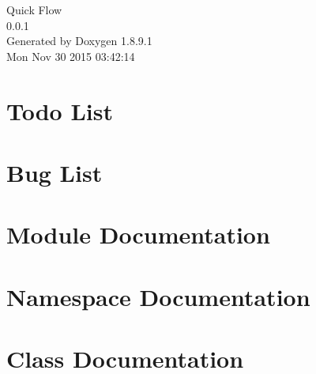 \documentclass[twoside]{article}
\newcommand{\+}{\discretionary{\mbox{\scriptsize$\hookleftarrow$}}{}{}}
\begin{document}
\hypersetup{pageanchor=false,
             bookmarks=true,
             bookmarksnumbered=true,
             pdfencoding=unicode
            }
\begin{titlepage}
\vspace*{7cm}
\begin{center}%
{\Large Quick Flow \\[1ex]\large 0.\+0.\+1 }\\
\vspace*{1cm}
{\large Generated by Doxygen 1.8.9.1}\\
\vspace*{0.5cm}
{\small Mon Nov 30 2015 03:42:14}\\
\end{center}
\end{titlepage}
\tableofcontents
{}
\hypersetup{pageanchor=true}

\section{Todo List}
\label{todo}
\hypertarget{todo}{}

\section{Bug List}
\label{bug}
\hypertarget{bug}{}

\section{Module Documentation}




\section{Namespace Documentation}

\section{Class Documentation}




















\end{document}
